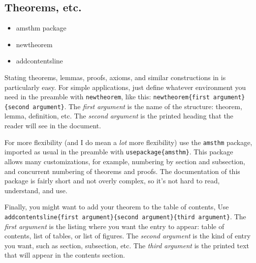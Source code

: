         \subsection{Theorems, etc.}
        \label{Theorems}
        
        \begin{cmd}
            \begin{itemize}
                \item{amsthm package}
                \item{newtheorem}
                \item{addcontentsline}
            \end{itemize}
        \end{cmd}

        Stating theorems, lemmas, proofs, axioms, and similar constructions in \Lx{} is particularly easy. For simple applications, just define whatever environment you need in the preamble with \texttt{newtheorem}, like this: \texttt{newtheorem\{first argument\}\{second argument\}}. The \textit{first argument} is the name of the structure: theorem, lemma, definition, etc. The \textit{second argument} is the printed heading that the reader will see in the document.

        For more flexibility (and I do mean a \textit{lot} more flexibility) use the \texttt{amsthm} package, imported as usual in the preamble with \texttt{usepackage\{amsthm\}}. This package allows many customizations, for example, numbering by section and subsection, and concurrent numbering of theorems and proofs. The documentation of this package is fairly short and not overly complex, so it's not hard to read, understand, and use.

        Finally, you might want to add your theorem to the table of contents, Use \texttt{addcontentsline\{first argument\}\{second argument\}\{third argument\}}. The \textit{first argument} is the listing where you want the entry to appear: table of contents, list of tables, or list of figures. The \textit{second argument} is the kind of entry you want, such as section, subsection, etc. The \textit{third argument} is the printed text that will appear in the contents section.

